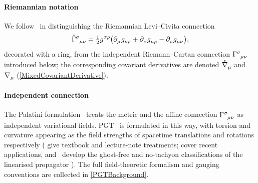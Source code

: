 \paragraph*{Riemannian notation}
We follow~\cite{barker2024poincare} in distinguishing the Riemannian
Levi--Civita connection
\begin{align}
  \rCon{^\sigma_{\mu\nu}}
    = \tfrac{1}{2}\g{^{\sigma\rho}}\bigl(
        \PD{_\mu}\g{_{\nu\rho}} + \PD{_\nu}\g{_{\mu\rho}}
        - \PD{_\rho}\g{_{\mu\nu}}\bigr),
  \label{LeviCivita}
\end{align}
decorated with a ring, from the independent Riemann--Cartan
connection $\MAGA{^\sigma_\mu_\nu}$ introduced below; the
corresponding covariant derivatives are denoted $\rD{_\mu}$ and
$\rcD{_\mu}$ (\cref{MixedCovariantDerivative}).

\paragraph*{Independent connection}
The Palatini
formulation~\cite{palatini1919deduzione,ferraris1982variational,barker2024palatini}
treats the metric and the affine connection
$\MAGA{^\sigma_\mu_\nu}$ as independent variational fields.
PGT~\cite{utiyama1956invariant,kibble1961lorentz,sciama1962physical,hayashi1979new,trautman1972einstein,hehl1976spin,hehl1995metric,blagojevic2002gravitation}
is formulated in this way, with torsion and curvature appearing as
the field strengths of spacetime translations and rotations
respectively
(\cite{blagojevic2002gravitation,blagojevic2003lectures,blagojevicHehl2013,hehlobukhov2007cartan}
give textbook and lecture-note treatments;
\cite{barker2025psalter2,barker2025hamilcar,barker2024r2,barker2025metricaffine,barker2025irfound1,barker2025irfound2,legner2025torc,bahamonde2025torsion,karananas2024weyl}
cover recent applications, and~\cite{lin2019pgt,blagojevic2018hamiltonian}
develop the ghost-free and no-tachyon classifications of the
linearised propagator%
). The full field-theoretic formalism and gauging conventions are collected in
\cref{PGTBackground}.

